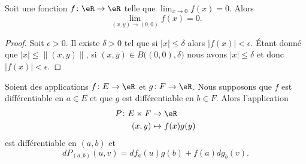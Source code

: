 \begin{proposition}	\label{PROPooUXWIooTVVURR}
	Soit une fonction \(f \colon \eR\to \eR  \) telle que \( \lim_{x\to 0}f(x)=0\). Alors
	\begin{equation}
		\lim_{(x,y)\to (0,0)}f(x)=0.
	\end{equation}
\end{proposition}

\begin{proof}
	Soit \( \epsilon>0\). Il existe \( \delta>0\) tel que si \(| x |\leq \delta \) alors \( | f(x) |<\epsilon\). Étant donné que \( | x |\leq \| (x,y) \|\), si \( (x,y)\in B\big( (0,0),\delta \big)\) nous avons \( | x |\leq \delta\) et donc \( | f(x) |<\epsilon\).
\end{proof}

\begin{proposition}	\label{PROPooIOMBooXoNBTM}
	Soient des applications \(f \colon E\to \eR  \) et \(g \colon F\to \eR  \). Nous supposons que \( f\) est différentiable en \( a\in E\) et que \( g\) est différentiable en \( b\in F\). Alors l'application
	\begin{equation}
		\begin{aligned}
			P\colon E\times F & \to \eR          \\
			(x,y)             & \mapsto f(x)g(y)
		\end{aligned}
	\end{equation}
	est différentiable en \( (a,b)\) et
	\begin{equation}
		dP_{(a,b)}(u,v)=df_a(u)g(b)+f(a)dg_b(v).
	\end{equation}
\end{proposition}

